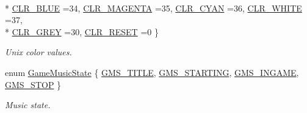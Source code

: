 \begin{DoxyCompactItemize}
\\*
\hyperlink{namespace_chase_game_a5acdf639e912d1e78814b7fae21afc7ba206cb9e67be830b771bbf44488c40d66}{C\-L\-R\-\_\-\-B\-L\-U\-E} =34, 
\hyperlink{namespace_chase_game_a5acdf639e912d1e78814b7fae21afc7ba6ce8de58df1a149d734ebcdbf711fed9}{C\-L\-R\-\_\-\-M\-A\-G\-E\-N\-T\-A} =35, 
\hyperlink{namespace_chase_game_a5acdf639e912d1e78814b7fae21afc7baa190fadb3645da6bca096b377cda2542}{C\-L\-R\-\_\-\-C\-Y\-A\-N} =36, 
\hyperlink{namespace_chase_game_a5acdf639e912d1e78814b7fae21afc7baefa8ce8fa562fcb596842176d5b1222d}{C\-L\-R\-\_\-\-W\-H\-I\-T\-E} =37, 
\\*
\hyperlink{namespace_chase_game_a5acdf639e912d1e78814b7fae21afc7ba1d11a3c17a5e12280a482d5d39c12f09}{C\-L\-R\-\_\-\-G\-R\-E\-Y} =30, 
\hyperlink{namespace_chase_game_a5acdf639e912d1e78814b7fae21afc7bab062e50df9f6e90f6c4cce85d5d420df}{C\-L\-R\-\_\-\-R\-E\-S\-E\-T} =0
 \}
\begin{DoxyCompactList}\small\item\em Unix color values. \end{DoxyCompactList}\item 
enum \hyperlink{namespace_chase_game_a85936e0bdb5509ede7ebb2543de5be42}{Game\-Music\-State} \{ \hyperlink{namespace_chase_game_a85936e0bdb5509ede7ebb2543de5be42ae2cef0894718493a1e334a948734fe65}{G\-M\-S\-\_\-\-T\-I\-T\-L\-E}, 
\hyperlink{namespace_chase_game_a85936e0bdb5509ede7ebb2543de5be42a9c9cc6c997ce9d50efd2f3d815323b11}{G\-M\-S\-\_\-\-S\-T\-A\-R\-T\-I\-N\-G}, 
\hyperlink{namespace_chase_game_a85936e0bdb5509ede7ebb2543de5be42a575913ea08f1bd0667c644624b56102f}{G\-M\-S\-\_\-\-I\-N\-G\-A\-M\-E}, 
\hyperlink{namespace_chase_game_a85936e0bdb5509ede7ebb2543de5be42aeff71e80a88a58ab6f8d049daaccc84a}{G\-M\-S\-\_\-\-S\-T\-O\-P}
 \}
\begin{DoxyCompactList}\small\item\em Music state. \end{DoxyCompactList}\end{DoxyCompactItemize}
